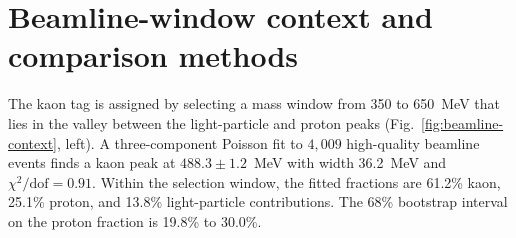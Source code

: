 \documentclass{article}
\begin{document}

\section{Beamline-window context and comparison methods}
\label{app:beamline}

The kaon tag is assigned by selecting a mass window from 350 to 650~MeV that
lies in the valley between the light-particle and proton peaks
(Fig.~\ref{fig:beamline-context},
left). A three-component Poisson fit to $4{,}009$ high-quality beamline events
finds a kaon peak at $488.3\pm1.2$~MeV with width 36.2~MeV and
$\chi^2/\mathrm{dof}=0.91$. Within the selection window, the fitted fractions are
61.2\% kaon, 25.1\% proton, and 13.8\% light-particle contributions. The 68\%
bootstrap interval on the proton fraction is 19.8\% to 30.0\%.
\end{document}
